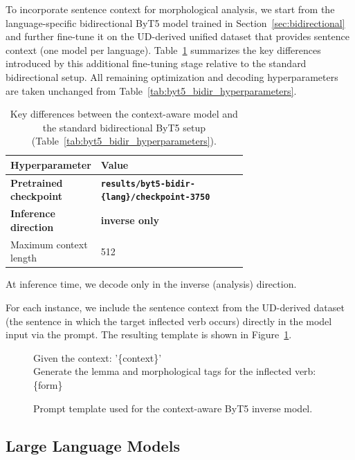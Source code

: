 To incorporate sentence context for morphological analysis, we start from the language-specific bidirectional ByT5 model trained in Section~\ref{sec:bidirectional} and further fine-tune it on the \ac{UD}-derived unified dataset that provides sentence context (one model per language). Table~\ref{tab:byt5_context_hyperparameters} summarizes the key differences introduced by this additional fine-tuning stage relative to the standard bidirectional setup. All remaining optimization and decoding hyperparameters are taken unchanged from Table~\ref{tab:byt5_bidir_hyperparameters}.

\begin{table}[h]
\centering
\small
\begin{tabular}{l p{0.68\linewidth}}
\toprule
Hyperparameter & Value \\
\midrule
\textbf{Pretrained checkpoint} & \textbf{\texttt{results/byt5-bidir-\{lang\}/}\allowbreak\texttt{checkpoint-3750}} \\
\textbf{Inference direction} & \textbf{inverse only} \\
Maximum context length & 512 \\
\bottomrule
\end{tabular}
\caption{Key differences between the context-aware model and the standard bidirectional ByT5 setup (Table~\ref{tab:byt5_bidir_hyperparameters}).}
\label{tab:byt5_context_hyperparameters}
\end{table}

At inference time, we decode only in the inverse (analysis) direction.

For each instance, we include the sentence context from the \ac{UD}-derived dataset (the sentence in which the target inflected verb occurs) directly in the model input via the prompt. The resulting template is shown in Figure~\ref{fig:byt5_inverse_prompt_context}.

\begin{figure}[ht]
\centering
\begin{minipage}{0.9\linewidth}
\small\ttfamily
Given the context: '\{context\}'\\
Generate the lemma and morphological tags for the inflected verb: \{form\}
\end{minipage}
\caption{Prompt template used for the context-aware ByT5 inverse model.}
\label{fig:byt5_inverse_prompt_context}
\end{figure}

\subsection{Large Language Models}

